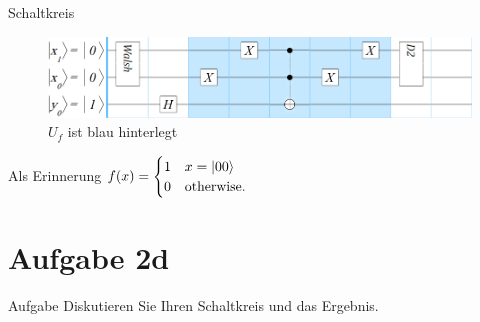 \documentclass[fleqn,compress,utf8,aspectratio=169,t]{beamer}
\begin{document}
\begin{frame}{Schaltkreis}
\begin{figure}
\centering
\includegraphics[width=\textwidth]{images/2c.png}
\caption{$U_f$ ist blau hinterlegt}
\end{figure}
Als Erinnerung $f(x) = \begin{cases}
1 & x = \ket{00}\\
0 & \text{otherwise.}\\
\end{cases}$
\end{frame}

\section{Aufgabe 2d}

\begin{frame}{Aufgabe}
Diskutieren Sie Ihren Schaltkreis und das Ergebnis.
\end{frame}
\end{document}
